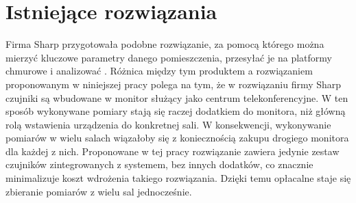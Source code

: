 \newpage
\section{Istniejące rozwiązania}
Firma Sharp przygotowała podobne rozwiązanie, za pomocą którego można mierzyć kluczowe 
parametry danego pomieszczenia, przesyłać je na platformy chmurowe i analizować 
\cite{sharp2022}. Różnica między tym produktem a rozwiązaniem proponowanym w niniejszej pracy 
polega na tym, że w rozwiązaniu firmy Sharp czujniki są wbudowane w monitor służący 
jako centrum telekonferencyjne. W ten sposób wykonywane pomiary stają się raczej 
dodatkiem do monitora, niż główną rolą wstawienia urządzenia do konkretnej sali. 
W konsekwencji, wykonywanie pomiarów w wielu salach wiązałoby się z koniecznością 
zakupu drogiego monitora dla każdej z nich. Proponowane w tej pracy rozwiązanie zawiera 
jedynie zestaw czujników zintegrowanych z systemem, bez innych dodatków, co 
znacznie minimalizuje koszt wdrożenia takiego rozwiązania. Dzięki temu opłacalne staje
się zbieranie pomiarów z wielu sal jednocześnie.